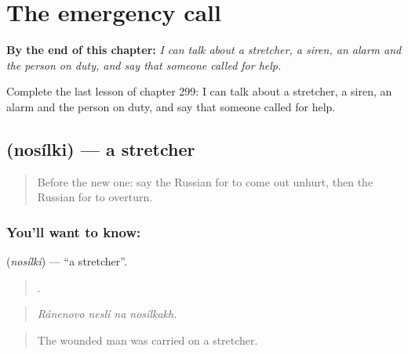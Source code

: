 
\chapter{The emergency call}
\label{ch:ru-the-emergency-call}

\begin{chapteropening}
\textbf{By the end of this chapter:} \emph{I can talk about a stretcher, a siren, an alarm and the person on duty, and say that someone called for help.}

Complete the last lesson of chapter 299: I can talk about a stretcher, a siren, an alarm and the person on duty, and say that someone called for help.
\end{chapteropening}

\section[\texorpdfstring{\ru{носилки} (nosílki)}{носилки (nosílki)}]{ (nosílki) — a stretcher}

\label{lesson:RU-C299-nosilki}



\begin{quote}
Before the new one: say the Russian for to come out unhurt, then the Russian for to overturn.
\end{quote}

\subsection*{You'll want to know: }
\textbf{} (\emph{nosílki}) — \textquotedblleft{}a stretcher\textquotedblright{}.

\begin{quote}
   .
\end{quote}

\begin{quote}
\emph{Ránenovo neslí na nosílkakh.}
\end{quote}

\begin{quote}
The wounded man was carried on a stretcher.
\end{quote}

